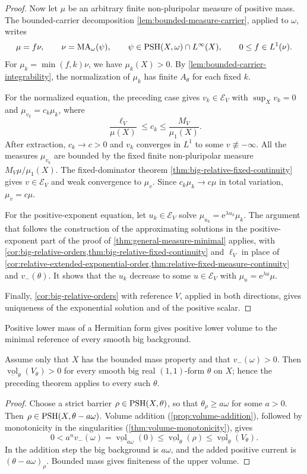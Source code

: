\begin{proof}
Now let $\mu$ be an arbitrary finite non-pluripolar measure of positive mass. The bounded-carrier decomposition \cref{lem:bounded-measure-carrier}, applied to $\omega$, writes
\[
 \mu=f\nu,\qquad \nu=\mathrm{MA}_\omega(\psi),\qquad
 \psi\in\mathrm{PSH}(X,\omega)\cap L^\infty(X),\qquad
 0\leq f\in L^1(\nu).
\]
For $\mu_k=\min(f,k)\nu$, we have $\mu_k(X)>0$. By \cref{lem:bounded-carrier-integrability}, the normalization of $\mu_k$ has finite $A_\theta$ for each fixed $k$.

For the normalized equation, the preceding case gives $v_k\in\mathcal E_V$ with $\sup_Xv_k=0$ and $\mu_{v_k}=c_k\mu_k$, where
\[
 \frac{\ell_V}{\mu(X)}\leq c_k\leq\frac{M_V}{\mu_1(X)}.
\]
After extraction, $c_k\to c>0$ and $v_k$ converges in $L^1$ to some $v\not\equiv-\infty$. All the measures $\mu_{v_k}$ are bounded by the fixed finite non-pluripolar measure $M_V\mu/\mu_1(X)$. The fixed-dominator theorem \cref{thm:big-relative-fixed-continuity} gives $v\in\mathcal E_V$ and weak convergence to $\mu_v$. Since $c_k\mu_k\to c\mu$ in total variation, $\mu_v=c\mu$.

For the positive-exponent equation, let $u_k\in\mathcal E_V$ solve $\mu_{u_k}=\mathrm{e}^{\lambda u_k}\mu_k$. The argument that follows the construction of the approximating solutions in the positive-exponent part of the proof of \cref{thm:general-measure-minimal} applies, with \cref{cor:big-relative-orders,thm:big-relative-fixed-continuity} and $\ell_V$ in place of \cref{cor:relative-extended-exponential-order,thm:relative-fixed-measure-continuity} and $v_-(\theta)$. It shows that the $u_k$ decrease to some $u\in\mathcal E_V$ with $\mu_u=\mathrm{e}^{\lambda u}\mu$.

Finally, \cref{cor:big-relative-orders} with reference $V$, applied in both directions, gives uniqueness of the exponential solution and of the positive scalar.
\end{proof}

Positive lower mass of a Hermitian form gives positive lower volume to the minimal reference of every smooth big background.

\begin{corollary}\label{cor:metric-pvp-minimal-volume}
Assume only that $X$ has the bounded mass property and that $v_-(\omega)>0$. Then $\underline{\operatorname{vol}}_\theta(V_\theta)>0$ for every smooth big real $(1,1)$-form $\theta$ on $X$; hence the preceding theorem applies to every such $\theta$.
\end{corollary}
\begin{proof}
Choose a strict barrier $\rho\in\mathrm{PSH}(X,\theta)$, so that $\theta_\rho\geq a\omega$ for some $a>0$. Then $\rho\in\mathrm{PSH}(X,\theta-a\omega)$. Volume addition (\cref{prop:volume-addition}), followed by monotonicity in the singularities (\cref{thm:volume-monotonicity}), gives
\[
 0<a^n v_-(\omega)
 =\underline{\operatorname{vol}}_{a\omega}(0)
 \leq\underline{\operatorname{vol}}_\theta(\rho)
 \leq\underline{\operatorname{vol}}_\theta(V_\theta).
\]
In the addition step the big background is $a\omega$, and the added positive current is $(\theta-a\omega)_\rho$. Bounded mass gives finiteness of the upper volume.
\end{proof}

